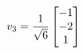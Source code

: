 \documentclass[preview]{standalone}
\begin{document}
\begin{align*}
\special{dvisvgm:raw <g id='unique000'>}v_{3} = \frac{1}{\sqrt{6}} \begin{bmatrix} -1 \\ -2 \\ 1 \end{bmatrix}\special{dvisvgm:raw </g>}
\end{align*}
\end{document}

